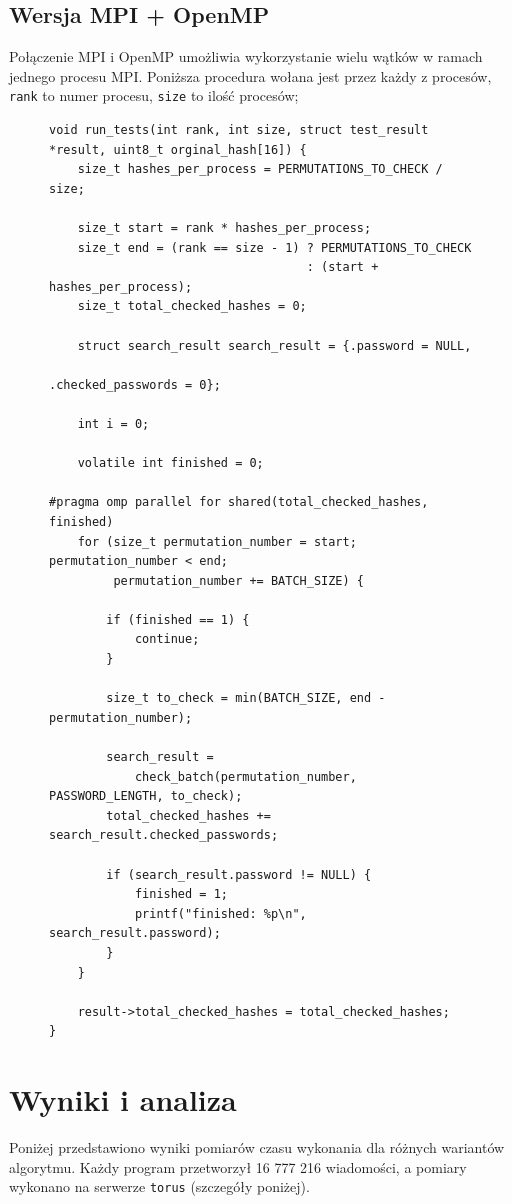 \documentclass[a4paper,12pt]{article}
\begin{document}
\subsection{Wersja MPI + OpenMP}
Połączenie MPI i OpenMP umożliwia wykorzystanie wielu wątków w ramach jednego procesu MPI. Poniższa procedura wołana jest przez każdy z procesów, \lstinline{rank} to numer procesu, \lstinline{size} to ilość procesów;
\begin{figure}[H]
\begin{lstlisting}
void run_tests(int rank, int size, struct test_result *result, uint8_t orginal_hash[16]) {
    size_t hashes_per_process = PERMUTATIONS_TO_CHECK / size;

    size_t start = rank * hashes_per_process;
    size_t end = (rank == size - 1) ? PERMUTATIONS_TO_CHECK
                                    : (start + hashes_per_process);
    size_t total_checked_hashes = 0;

    struct search_result search_result = {.password = NULL,
                                          .checked_passwords = 0};

    int i = 0;

    volatile int finished = 0;

#pragma omp parallel for shared(total_checked_hashes, finished)
    for (size_t permutation_number = start; permutation_number < end;
         permutation_number += BATCH_SIZE) {

        if (finished == 1) {
            continue;
        }

        size_t to_check = min(BATCH_SIZE, end - permutation_number);

        search_result =
            check_batch(permutation_number, PASSWORD_LENGTH, to_check);
        total_checked_hashes += search_result.checked_passwords;

        if (search_result.password != NULL) {
            finished = 1;
            printf("finished: %p\n", search_result.password);
        }
    }

    result->total_checked_hashes = total_checked_hashes;
}
\end{lstlisting}
\end{figure}

\section{Wyniki i analiza}
Poniżej przedstawiono wyniki pomiarów czasu wykonania dla różnych wariantów algorytmu. Każdy program przetworzył 16 777 216 wiadomości, a pomiary wykonano na serwerze \texttt{torus} (szczegóły poniżej).
\end{document}
